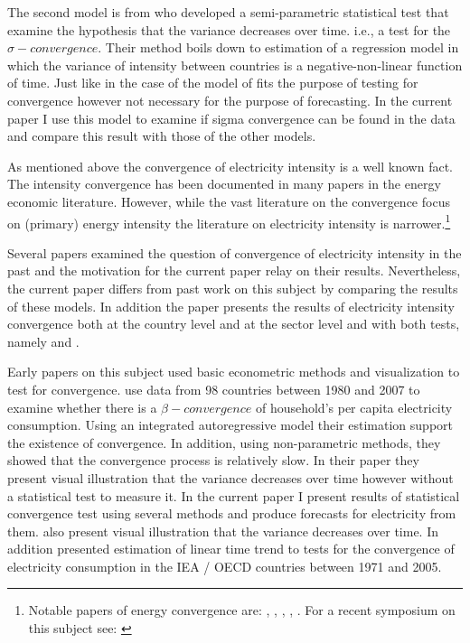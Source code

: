 \documentclass[]{amsart}
\begin{document}
\bigskip

The second model is from \cite{PhillipsSul2007} who developed a semi-parametric statistical test that examine the hypothesis that the variance decreases over time. i.e., a test for the $\sigma-convergence$. Their method boils down to estimation of a regression model in which the variance of intensity between countries is a negative-non-linear function of time. Just like in the case of \cite{barro1992convergence} the model of \cite{PhillipsSul2007} fits the purpose of testing for convergence however not necessary for the purpose of forecasting. In the current paper I use this model to examine if sigma convergence can be found in the data and compare this result with those of the other models.

\bigskip

As mentioned above the convergence of electricity intensity is a well known fact. The intensity convergence has been documented in many papers in the energy economic literature. However, while the vast literature on the convergence focus on (primary) energy intensity the literature on electricity intensity is narrower.\footnote{Notable papers of energy convergence are: \cite{MulderGroot2012}, \cite{MohammadiRam2017}, \cite{ApergisChristou2016}, \cite{BurnettMadariaga2017}, \cite{Fallahi2017} \cite{AdhikariChen2014}. For a recent symposium on this subject see: \cite{ApergisEwingPayne2017}}

\bigskip

Several papers examined the question of convergence of electricity intensity in the past and the motivation for the current paper relay on their results. Nevertheless, the current paper differs from past work on this subject by comparing the results of these models. In addition the paper presents the results of electricity intensity convergence both at the country level and at the sector level and with both tests, namely \cite{barro1992convergence} and \cite{PhillipsSul2007}.

\bigskip

Early papers on this subject used basic econometric methods and visualization to test for convergence. \cite{MazaVillaverde2008} use data from 98 countries between 1980 and 2007 to examine whether there is a $\beta-convergence$ of household's per capita electricity consumption. Using an integrated autoregressive model their estimation support the existence of convergence. In addition, using non-parametric methods, they showed that the convergence process is relatively slow. In their paper they present visual illustration that the variance decreases over time however without a statistical test to measure it. In the current paper I present results of statistical convergence test using several methods and produce forecasts for electricity from them. \cite{Liddle2009} also present visual illustration that the variance decreases over time. In addition \cite{Liddle2009} presented estimation of linear time trend to tests for the convergence of electricity consumption in the IEA / OECD countries between 1971 and 2005.
\end{document}

